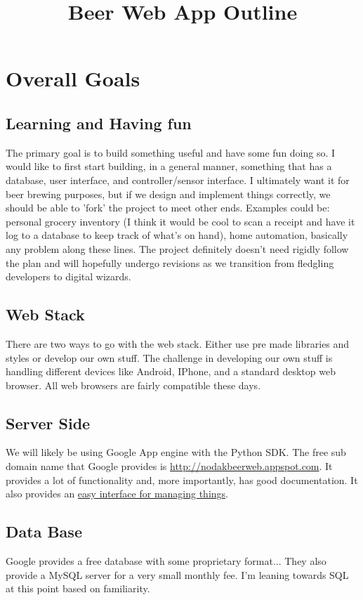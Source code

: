 \documentclass[a4paper,12pt]{article}
\begin{document}
\title{Beer Web App Outline}
\tableofcontents
\maketitle
\section{Overall Goals}
\subsection{Learning and Having fun}
The primary goal is to build something useful and have some fun doing so. I would like to first start building, in a general manner, something that has a database, user interface, and controller/sensor interface. I ultimately want it for beer brewing purposes, but if we design and implement things correctly, we should be able to 'fork' the project to meet other ends. Examples could be: personal grocery inventory (I think it would be cool to scan a receipt and have it log to a database to keep track of what's on hand), home automation, basically any problem along these lines. The project definitely doesn't need rigidly follow the plan and will hopefully undergo revisions as we transition from fledgling developers to digital wizards.

\subsection{Web Stack}
There are two ways to go with the web stack. Either use pre made libraries and styles or develop our own stuff. The challenge in developing our own stuff is handling different devices like Android, IPhone, and a standard desktop web browser. All web browsers are fairly compatible these days.

\subsection{Server Side}
We will likely be using Google App engine with the Python SDK. The free sub domain name that Google provides is \url{http://nodakbeerweb.appspot.com}. It provides a lot of functionality and, more importantly, has good documentation. It also provides an \href{https://console.developers.google.com/project/nodakbeerweb}{easy interface for managing things}.

\subsection{Data Base}
Google provides a free database with some proprietary format... They also provide a MySQL server for a very small monthly fee. I'm leaning towards SQL at this point based on familiarity.
\end{document}
